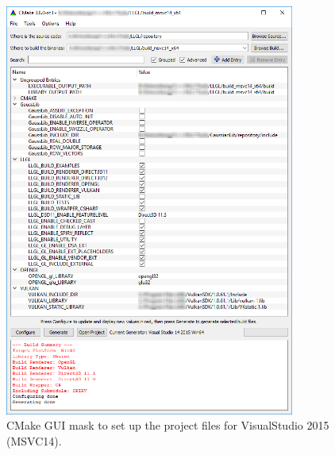 \documentclass{article}
\begin{document}
\begin{figure}[ht]
	\centering
	\includegraphics[width=0.85\textwidth]{cmake_mask1}
	\caption{CMake GUI mask to set up the project files for VisualStudio 2015 (MSVC14).}
	\label{fig:cmake_mask1}
\end{figure}
\end{document}
